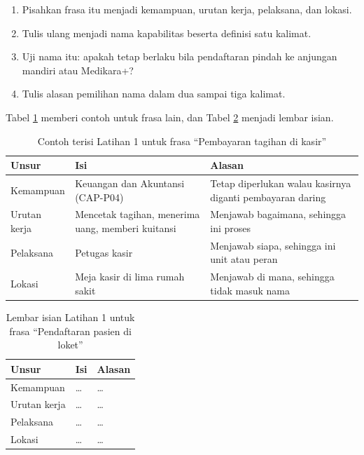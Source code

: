 \begin{enumerate}
  \item Pisahkan frasa itu menjadi kemampuan, urutan kerja, pelaksana, dan lokasi.
  \item Tulis ulang menjadi nama kapabilitas beserta definisi satu kalimat.
  \item Uji nama itu: apakah tetap berlaku bila pendaftaran pindah ke anjungan mandiri atau Medikara+?
  \item Tulis alasan pemilihan nama dalam dua sampai tiga kalimat.
\end{enumerate}

Tabel \ref{tab:ch05-lat1-contoh} memberi contoh untuk frasa lain, dan Tabel \ref{tab:ch05-lat1-hasil} menjadi lembar isian.

\begin{table}[!htb]
  \centering
  \caption{Contoh terisi Latihan 1 untuk frasa ``Pembayaran tagihan di kasir''}
  \label{tab:ch05-lat1-contoh}
  \small
  \begin{tabularx}{\textwidth}{>{\raggedright\arraybackslash}p{2.6cm}>{\raggedright\arraybackslash}X>{\raggedright\arraybackslash}X}
    \hline
    \textbf{Unsur} & \textbf{Isi} & \textbf{Alasan} \\
    \hline
    Kemampuan & Keuangan dan Akuntansi (CAP-P04) & Tetap diperlukan walau kasirnya diganti pembayaran daring \\
    \hline
    Urutan kerja & Mencetak tagihan, menerima uang, memberi kuitansi & Menjawab bagaimana, sehingga ini proses \\
    \hline
    Pelaksana & Petugas kasir & Menjawab siapa, sehingga ini unit atau peran \\
    \hline
    Lokasi & Meja kasir di lima rumah sakit & Menjawab di mana, sehingga tidak masuk nama \\
    \hline
  \end{tabularx}
\end{table}

\begin{table}[!htb]
  \centering
  \caption{Lembar isian Latihan 1 untuk frasa ``Pendaftaran pasien di loket''}
  \label{tab:ch05-lat1-hasil}
  \small
  \begin{tabularx}{\textwidth}{>{\raggedright\arraybackslash}p{2.6cm}>{\raggedright\arraybackslash}X>{\raggedright\arraybackslash}X}
    \hline
    \textbf{Unsur} & \textbf{Isi} & \textbf{Alasan} \\
    \hline
    Kemampuan & \dots & \dots \\
    \hline
    Urutan kerja & \dots & \dots \\
    \hline
    Pelaksana & \dots & \dots \\
    \hline
    Lokasi & \dots & \dots \\
    \hline
  \end{tabularx}
\end{table}

